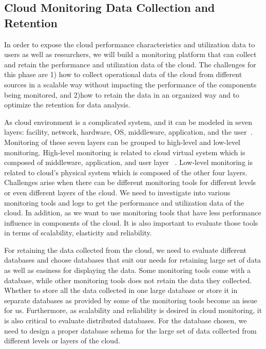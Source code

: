 \subsection{Cloud Monitoring Data Collection and Retention}


In order to expose the cloud performance characteristics and utilization data to users as well as researchers, we will build a monitoring platform that can collect and retain the performance and utilization data of the cloud. The challenges for this phase are 1) how to collect operational data of the cloud from different sources in a scalable way without impacting the performance of the components being monitored, and 2)how to retain the data in an organized way and to optimize the retention for data analysis.

As cloud environment is a complicated system, and it can be modeled in seven layers: facility, network, hardware, OS, middleware, application, and the user~\cite{spring2011monitoring}. Monitoring of these seven layers can be grouped to high-level and low-level monitoring. High-level monitoring is related to cloud virtual system which is composed of middleware, application, and user layer ~\cite{Aceto2013}. Low-level monitoring is related to cloud’s physical system which is composed of the other four layers. Challenges arise when there can be different monitoring tools for different levels or even different layers of the cloud. We need to investigate into various monitoring tools and logs to get the performance and utilization data of the cloud. In addition, as we want to use monitoring tools that have less performance influence in components of the cloud. It is also important to evaluate those tools in terms of scalability, elasticity and reliability.

For retaining the data collected from the cloud, we need to evaluate different databases and choose databases that suit our needs for retaining large set of data as well as easiness for displaying the data. Some monitoring tools come with a database, while other monitoring tools does not retain the data they collected. Whether to store all the data collected in one large database or store it in separate databases as provided by some of the monitoring tools become an issue for us. Furthermore, as scalability and reliability is desired in cloud monitoring, it is also critical to evaluate distributed databases. For the database chosen, we need to design a proper database schema for the large set of data collected from different levels or layers of the cloud.